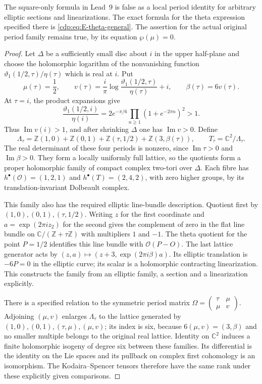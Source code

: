 
\begin{proposition}\label{cdp:st:E18}
The square-only formula in Lead~9 is false as a local period
identity for arbitrary elliptic sections and linearizations.
The exact formula for the theta expression specified there is
\eqref{cdp:eq:E-theta-general}. The assertion for the actual original
period family remains true, by its equation $\wp(\mu)=0$.
\end{proposition}
\begin{proof}
Let $\Delta$ be a sufficiently small disc about $i$ in the upper
half-plane and choose the holomorphic logarithm of the nonvanishing
function $\vartheta_1(1/2,\tau)/\eta(\tau)$ which is real at $i$.
Put
\[
 \mu(\tau)=\frac12,\qquad
 v(\tau)=\frac{i}{\pi}
       \log\frac{\vartheta_1(1/2,\tau)}{\eta(\tau)}+i,
 \qquad \beta(\tau)=6v(\tau).
\]
At $\tau=i$, the product expansions give
\[
 \frac{\vartheta_1(1/2,i)}{\eta(i)}
 =2e^{-\pi/6}\prod_{n\geq1}(1+e^{-2\pi n})^2>1.
\]
Thus $\operatorname{Im}v(i)>1$, and after shrinking $\Delta$
one has $\operatorname{Im}v>0$. Define
\[
 \Lambda_\tau=\mathbb Z(1,0)+\mathbb Z(0,1)
 +\mathbb Z(\tau,1/2)+\mathbb Z(3,\beta(\tau)),
 \qquad T_\tau=\mathbb C^2/\Lambda_\tau.
\]
The real determinant of these four periods is nonzero, since
$\operatorname{Im}\tau>0$ and $\operatorname{Im}\beta>0$.
They form a locally uniformly full lattice, so the quotients form
a proper holomorphic family of compact complex two-tori over
$\Delta$. Each fibre has
$h^\bullet(\mathcal O)=(1,2,1)$ and
$h^\bullet(T)=(2,4,2)$, with zero higher groups, by its
translation-invariant Dolbeault complex.

This family also has the required elliptic line-bundle
description. Quotient first by $(1,0),(0,1),(\tau,1/2)$.
Writing $z$ for the first coordinate and $a=\exp(2\pi iz_2)$
for the second gives the complement of zero in the flat line
bundle on $\mathbb C/(\mathbb Z+\tau\mathbb Z)$ with multipliers
$1$ and $-1$. The theta quotient for the point $P=1/2$ identifies
this line bundle with $\mathcal O(P-O)$. The last lattice
generator acts by
$(z,a)\mapsto(z+3,\exp(2\pi i\beta)a)$.
Its elliptic translation is $-6P=0$ in the elliptic curve;
its scalar is a holomorphic contracting linearization. This
constructs the family from an elliptic family, a section and a
linearization explicitly.

There is a specified relation to the symmetric period matrix
$\Omega=\left(\begin{smallmatrix}\tau&\mu\\\mu&v\end{smallmatrix}\right)$.
Adjoining $(\mu,v)$ enlarges $\Lambda_\tau$ to the lattice
generated by $(1,0),(0,1),(\tau,\mu),(\mu,v)$; its index is six,
because $6(\mu,v)=(3,\beta)$ and no smaller multiple belongs
to the original real lattice. Identity on $\mathbb C^2$ induces
a finite holomorphic isogeny of degree six between these families.
Its differential is the identity on the Lie spaces and its
pullback on complex first cohomology is an isomorphism. The
Kodaira--Spencer tensors therefore have the same rank under
these explicitly given comparisons.


\end{proof}
